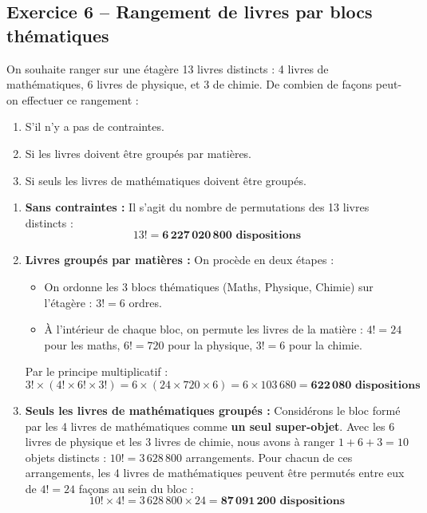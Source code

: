 \documentclass[11pt,a4paper]{article}
\begin{document}
\vspace{0.3cm}

\subsection*{Exercice 6 -- Rangement de livres par blocs thématiques}

On souhaite ranger sur une étagère 13 livres distincts : 4 livres de mathématiques, 6 livres de physique, et 3 de chimie. De combien de façons peut-on effectuer ce rangement :
\begin{enumerate}[label=\arabic*.]
    \item S'il n'y a pas de contraintes.
    \item Si les livres doivent être groupés par matières.
    \item Si seuls les livres de mathématiques doivent être groupés.
\end{enumerate}

\begin{correctionbox}
\begin{enumerate}[label=\arabic*.]
    \item \textbf{Sans contraintes :}
    Il s'agit du nombre de permutations des 13 livres distincts :
    \[
    13! = \mathbf{6\,227\,020\,800\text{ dispositions}}
    \]

    \item \textbf{Livres groupés par matières :}
    On procède en deux étapes :
    \begin{itemize}[label=$\bullet$]
        \item On ordonne les 3 blocs thématiques (Maths, Physique, Chimie) sur l'étagère : $3! = 6$ ordres.
        \item À l'intérieur de chaque bloc, on permute les livres de la matière : $4! = 24$ pour les maths, $6! = 720$ pour la physique, $3! = 6$ pour la chimie.
    \end{itemize}
    Par le principe multiplicatif :
    \[
    3! \times (4! \times 6! \times 3!) = 6 \times (24 \times 720 \times 6) = 6 \times 103\,680 = \mathbf{622\,080\text{ dispositions}}
    \]

    \item \textbf{Seuls les livres de mathématiques groupés :}
    Considérons le bloc formé par les 4 livres de mathématiques comme \textbf{un seul super-objet}.
    Avec les 6 livres de physique et les 3 livres de chimie, nous avons à ranger $1 + 6 + 3 = 10$ objets distincts : $10! = 3\,628\,800$ arrangements.
    Pour chacun de ces arrangements, les 4 livres de mathématiques peuvent être permutés entre eux de $4! = 24$ façons au sein du bloc :
    \[
    10! \times 4! = 3\,628\,800 \times 24 = \mathbf{87\,091\,200\text{ dispositions}}
    \]
\end{enumerate}
\end{correctionbox}
\end{document}
